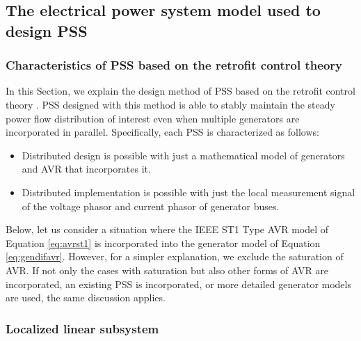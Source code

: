 \documentclass[graybox, envcountchap]{svmult}
\begin{document}
\subsection{The electrical power system model used to design PSS\advanced}

\smallskip
\subsubsection{Characteristics of PSS based on the retrofit control theory}

In this Section, we explain the design method of PSS based on the retrofit control theory \cite{ishizaki2018retrofit,sadamoto2018retrofit,sasahara2019damping,ishizaki2019retrofit,ishizaki2021modularity}.
PSS designed with this method is able to stably maintain the steady power flow distribution of interest even when multiple generators are incorporated in parallel.
Specifically, each PSS is characterized as follows:
\begin{itemize}
\item Distributed design is possible with just a mathematical model of generators and AVR that incorporates it.
\item Distributed implementation is possible with just the local measurement signal of the voltage phasor and current phasor of generator buses.
\end{itemize}
Below, let us consider a situation where the IEEE ST1 Type AVR model of Equation \ref{eq:avrst1} is incorporated into the generator model of Equation \ref{eq:gendifavr}.
However, for a simpler explanation, we exclude the saturation of AVR.
If not only the cases with saturation but also other forms of AVR are incorporated, an existing PSS is incorporated, or more detailed generator models are used, the same discussion applies.

\smallskip
\subsubsection{Localized linear subsystem}
\end{document}
